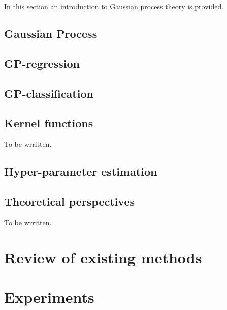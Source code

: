 \documentclass[12pt]{article}
\begin{document}
In this section an introduction to Gaussian process theory is provided.

\subsection{Gaussian Process}
	
	
\subsection{GP-regression}
	
		
\subsection{GP-classification}
	
	
\subsection{Kernel functions}
	To be wrritten.
	
\subsection{Hyper-parameter estimation}
	
	
\subsection{Theoretical perspectives}
	\hspace{0.6cm}To be wrritten.

\pagebreak
\section{Review of existing methods}
	
	\pagebreak

\section{Experiments}
	
\end{document}
